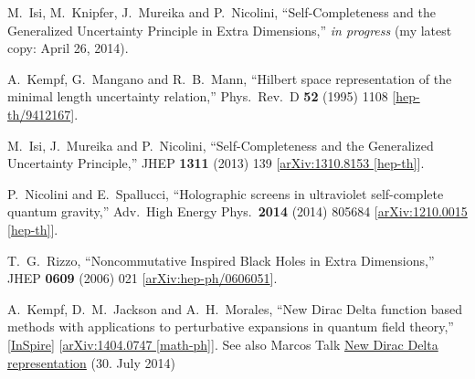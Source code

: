 \documentclass[10pt,a4paper]{article}
\begin{document}
\vfill
\begin{thebibliography}{}
  M.~Isi, M.~Knipfer, J.~Mureika and P.~Nicolini,
  ``Self-Completeness and the Generalized Uncertainty Principle in Extra Dimensions,'' \textit{in progress} (my latest copy: April 26, 2014).
  
  A.~Kempf, G.~Mangano and R.~B.~Mann,
  ``Hilbert space representation of the minimal length uncertainty relation,''
  Phys.\ Rev.\ D {\bf 52} (1995) 1108
  [\href{http://arxiv.org/abs/hep-th/9412167}{hep-th/9412167}].

  M.~Isi, J.~Mureika and P.~Nicolini,
  ``Self-Completeness and the Generalized Uncertainty Principle,''
  JHEP {\bf 1311} (2013) 139
  [\href{http://arxiv.org/abs/arXiv:1310.8153}{arXiv:1310.8153 [hep-th]}].
  
  
  P.~Nicolini and E.~Spallucci,
  ``Holographic screens in ultraviolet self-complete quantum gravity,''
  Adv.\ High Energy Phys.\  {\bf 2014} (2014) 805684
  [\href{http://arxiv.org/abs/arXiv:1210.0015}{arXiv:1210.0015 [hep-th]}].
  
  T.~G.~Rizzo,
  ``Noncommutative Inspired Black Holes in Extra Dimensions,''
  JHEP {\bf 0609} (2006) 021
  [\href{http://arxiv.org/abs/hep-ph/0606051hep-ph/0606051}{arXiv:hep-ph/0606051}].

  A.~Kempf, D.~M.~Jackson and A.~H.~Morales,
  ``New Dirac Delta function based methods with applications to perturbative expansions in quantum field theory,''
  [\href{http://inspirehep.net/record/1288521}{InSpire}] [\href{http://arxiv.org/abs/1404.0747}{arXiv:1404.0747 [math-ph]}].
  See also Marcos Talk \href{https://fias.uni-frankfurt.de/~koeppel/journalclub/ss2014/14-07-30/slides-dirac-delta.pdf}{New Dirac Delta representation} (30. July 2014)


\end{thebibliography}
\end{document}
